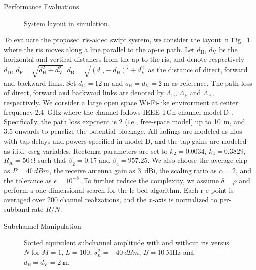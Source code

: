\begin{section}{Performance Evaluations}\label{sc:performance_evaluation}
	\begin{figure}[H]
		\centering
		\def\svgwidth{0.9\columnwidth}
		
		\caption{System layout in simulation.}
		\label{fg:layout}
	\end{figure}

	To evaluate the proposed \gls{ris}-aided \gls{swipt} system, we consider the layout in Fig.~\ref{fg:layout} where the \gls{ris} moves along a line parallel to the \gls{ap}-\gls{ue} path. Let $d_{\mathrm{H}}$, $d_{\mathrm{V}}$ be the horizontal and vertical distances from the \gls{ap} to the \gls{ris}, and denote respectively $d_{\mathrm{D}}$, $d_{\mathrm{F}}=\sqrt{d_{\mathrm{H}}^2+d_{\mathrm{V}}^2}$, $d_{\mathrm{B}}=\sqrt{(d_{\mathrm{D}}-d_{\mathrm{H}})^2+d_{\mathrm{V}}^2}$ as the distance of direct, forward and backward links. Set $d_{\mathrm{D}}=\qty{12}{\meter}$ and $d_{\mathrm{H}}=d_{\mathrm{V}}=\qty{2}{\meter}$ as reference. The path loss of direct, forward and backward links are denoted by $\Lambda_{\mathrm{D}}$, $\Lambda_{\mathrm{F}}$ and $\Lambda_{\mathrm{B}}$, respectively. We consider a large open space Wi-Fi-like environment at center frequency \qty{2.4}{\GHz} where the channel follows IEEE TGn channel model D \cite{Erceg2004}. Specifically, the path loss exponent is \num{2} (i.e., free-space model) up to \qty{10}{\meter}, and \num{3.5} onwards to penalize the potential blockage. All fadings are modeled as \gls{nlos} with tap delays and powers specified in model D, and the tap gains are modeled as i.i.d. \gls{cscg} variables. Rectenna parameters are set to $k_2=0.0034$, $k_4=0.3829$, $R_{\mathrm{A}}=\qty{50}{\ohm}$ \cite{Clerckx2016a} such that $\beta_2=0.17$ and $\beta_4=957.25$. We also choose the average \gls{eirp} as $P=\qty{40}{dBm}$, the receive antenna gain as \qty{3}{dBi}, the scaling ratio as $\alpha=2$, and the tolerance as $\epsilon=10^{-8}$. To further reduce the complexity, we assume $\delta=\rho$ and perform a one-dimensional search for the \gls{lc}-\gls{bcd} algorithm. Each \gls{r-e} point is averaged over \num{200} channel realizations, and the $x$-axis is normalized to per-subband rate $R/N$.

	\begin{subsection}{Subchannel Manipulation}
		\begin{figure}[H]
			\centering
			\resizebox{0.8\columnwidth}{!}{
				
			}
			\caption{Sorted equivalent subchannel amplitude with and without \gls{ris} versus $N$ for $M=1$, $L=100$, $\sigma_n^2=\qty{-40}{dBm}$, $B=\qty{10}{\MHz}$ and $d_{\mathrm{H}}=d_{\mathrm{V}}=\qty{2}{\meter}$.}
			\label{fg:channel_amplitude}
		\end{figure}


\end{subsection}
\end{section}
